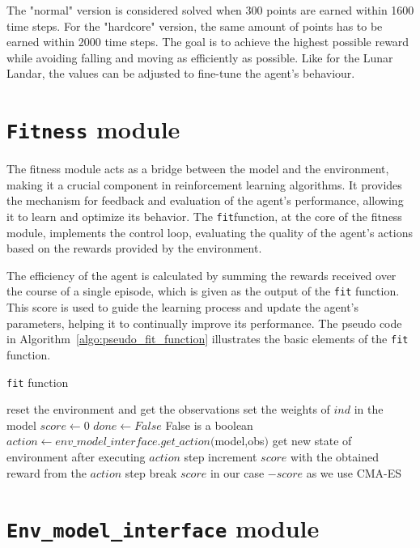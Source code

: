 The "normal" version is considered solved when 300 points are earned within 1600 time steps. For the "hardcore" version, the same amount of points has to be earned within 2000 time steps. The goal is to achieve the highest possible reward while avoiding falling and moving as efficiently as possible. Like for the Lunar Landar, the values can be adjusted to fine-tune the agent's behaviour.

\section{\texttt{Fitness} module}

The fitness module acts as a bridge between the model and the environment, making it a crucial component in reinforcement learning algorithms. It provides the mechanism for feedback and evaluation of the agent's performance, allowing it to learn and optimize its behavior. The \texttt{fit}function, at the core of the fitness module, implements the control loop, evaluating the quality of the agent's actions based on the rewards provided by the environment.

The efficiency of the agent is calculated by summing the rewards received over the course of a single episode, which is given as the output of the \texttt{fit} function. This score is used to guide the learning process and update the agent's parameters, helping it to continually improve its performance. The pseudo code in Algorithm~\ref{algo:pseudo_fit_function} illustrates the basic elements of the \texttt{fit} function.

\begin{algorithm}
\caption{\texttt{fit} function}
\label{algo:pseudo_fit_function}
\begin{algorithmic}
\State reset the environment and get the observations
\State set the weights of $ind$ in the model
\State $score \gets 0$
\State $ done \gets False$ \Comment False is a boolean
    \State $action \gets env\_model\_interface.get\_action($model,obs$)$
    \State get new state of environment after executing $action$ step
    \State increment $score$ with the obtained reward from the $action$ step
        \State break
    \EndIf
\EndFor
\Return $score$ \Comment in our case $-score$ as we use CMA-ES
\EndFunction
\end{algorithmic}
\end{algorithm}


\section{\texttt{Env\_model\_interface} module}

